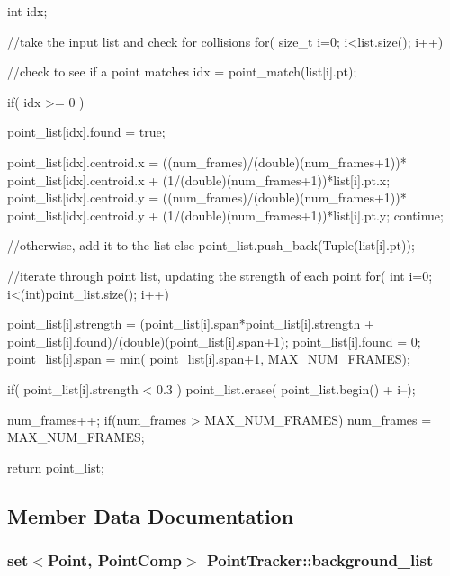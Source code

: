 \begin{DoxyCode}
                                                                     {
    
    int idx;
    
    //take the input list and check for collisions
    for( size_t i=0; i<list.size(); i++){
        
        //check to see if a point matches
        idx = point_match(list[i].pt);
        
        if( idx >= 0 ){
            point_list[idx].found = true;
            
            point_list[idx].centroid.x = ((num_frames)/(double)(num_frames+1))*
      point_list[idx].centroid.x + (1/(double)(num_frames+1))*list[i].pt.x;
            point_list[idx].centroid.y = ((num_frames)/(double)(num_frames+1))*
      point_list[idx].centroid.y + (1/(double)(num_frames+1))*list[i].pt.y;
            continue;
        }
        //otherwise, add it to the list
        else{
            point_list.push_back(Tuple(list[i].pt));
        }
    }
    
    //iterate through point list, updating the strength of each point
    for( int i=0; i<(int)point_list.size(); i++){
        point_list[i].strength = (point_list[i].span*point_list[i].strength + 
      point_list[i].found)/(double)(point_list[i].span+1);
        point_list[i].found = 0;
        point_list[i].span = min( point_list[i].span+1, MAX_NUM_FRAMES);
        
        
        if( point_list[i].strength < 0.3 )
            point_list.erase( point_list.begin() + i--);
    }
    
    num_frames++;
    if(num_frames > MAX_NUM_FRAMES)
        num_frames = MAX_NUM_FRAMES;
    
    return point_list;
}
\end{DoxyCode}


\subsection{\-Member \-Data \-Documentation}
\hypertarget{class_point_tracker_a7a1f2bb3c992232a04c886cc5bc6c21f}{
\subsubsection[{background\-\_\-list}]{\setlength{\rightskip}{0pt plus 5cm}set$<$\-Point, {\bf \-Point\-Comp}$>$ {\bf \-Point\-Tracker\-::background\-\_\-list}}}
\label{class_point_tracker_a7a1f2bb3c992232a04c886cc5bc6c21f}


